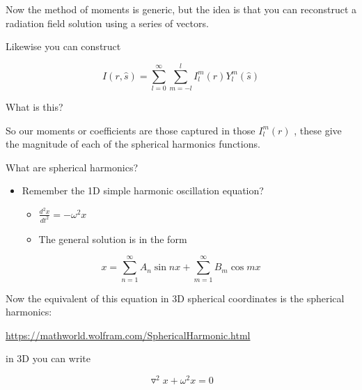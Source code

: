 \documentclass[12pt]{article}
\renewcommand{\_}{\kern-1.5pt\textunderscore\kern-1.5pt}
\begin{document}
Now the method of moments is generic, but the idea is that you can reconstruct a radiation field solution using a series of vectors.\par

Likewise you can construct\par

 \[ I \left( r,\hat{s} \right) = \sum _{l=0}^{\infty} \sum _{m=-l}^{l}I_{l}^{m} \left( r \right) Y_{l}^{m} \left( \hat{s} \right)  \] \par

What is this?\par

So our moments or coefficients are those captured in those  \( I_{l}^{m} \left( r \right)  \) , these give the magnitude of each of the spherical harmonics functions.\par

What are spherical harmonics?\par

\begin{itemize}
	\item Remember the 1D simple harmonic oscillation equation?\par

\begin{itemize}
	\item  \( \frac{d^{2}x}{dt^{2}}=- \omega ^{2}x \) \par

	\item The general solution is in the form
\end{itemize}
\end{itemize}\par

\begin{adjustwidth}{0.75in}{0.0in}
 \[ x= \sum _{n=1}^{\infty}A_{n}\sin nx+ \sum _{m=1}^{\infty}B_{m}\cos mx \] \par

\end{adjustwidth}

Now the equivalent of this equation in 3D spherical coordinates is the spherical harmonics:\par

\href{https://mathworld.wolfram.com/SphericalHarmonic.html}{https://mathworld.wolfram.com/SphericalHarmonic.html}\par

in 3D you can write\par

 \[ \triangledown ^{2}x+ \omega ^{2}x=0 \] \par
\end{document}
